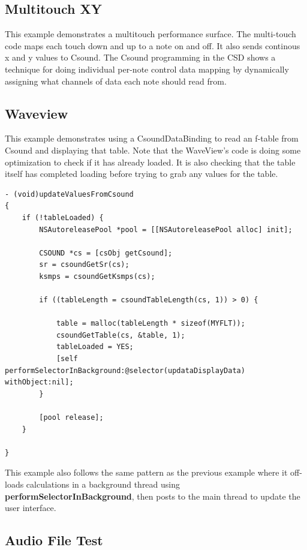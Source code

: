 \documentclass[11pt]{article}
\begin{document}
\subsection{Multitouch XY}

This example demonstrates a multitouch performance surface. The multi-touch code maps each touch down and up to a note on and off.  It also sends continous x and y values to Csound.  The Csound programming in the CSD shows a technique for doing individual per-note control data mapping by dynamically assigning what channels of data each note should read from.

\subsection{Waveview}

This example demonstrates using a CsoundDataBinding to read an f-table from Csound and displaying that table.  Note that the WaveView's code is doing some optimization to check if it has already loaded.  It is also checking that the table itself has completed loading before trying to grab any values for the table.

\begin{lstlisting}[caption=Waveview code demonstrating reading f-tables from Csound]
- (void)updateValuesFromCsound
{
    if (!tableLoaded) {
        NSAutoreleasePool *pool = [[NSAutoreleasePool alloc] init];

        CSOUND *cs = [csObj getCsound];
        sr = csoundGetSr(cs);
        ksmps = csoundGetKsmps(cs);

        if ((tableLength = csoundTableLength(cs, 1)) > 0) {

            table = malloc(tableLength * sizeof(MYFLT));
            csoundGetTable(cs, &table, 1);
            tableLoaded = YES;
            [self performSelectorInBackground:@selector(updataDisplayData) withObject:nil];
        }

        [pool release];
    }

}
\end{lstlisting}

This example also follows the same pattern as the previous example where it off-loads calculations in a background thread using \textbf{performSelectorInBackground}, then posts to the main thread to update the user interface.

\subsection{Audio File Test}
\end{document}
